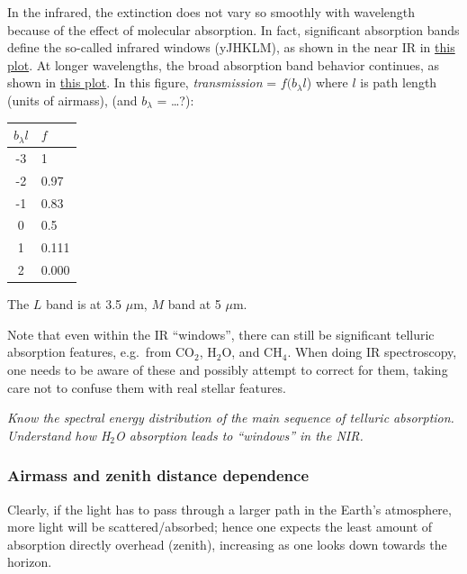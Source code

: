 \documentclass[12pt]{article}
\newcommand{\test}[1]{%
    \begin{center}
        {\parbox{0.9\textwidth}{\textit{\small#1}}}
    \end{center}}
\begin{document}
In the infrared, the extinction does not vary so smoothly with wavelength
because of the effect of molecular absorption. In fact, significant absorption
bands define the so-called infrared windows (yJHKLM), as shown in the near IR in \href{http://astronomy.nmsu.edu/holtz/a535/html/diagrams/a535/mandbell.htm}
{this plot}. At longer wavelengths, the broad absorption band behavior
continues, as shown in \href{http://astronomy.nmsu.edu/holtz/a535/html/diagrams/a535/allen1.htm}
{this plot}. In this figure, \emph{transmission} = $f(b_{\lambda}l$) where $l$
is path length (units of airmass), (and $b_{\lambda}$ = \ldots ?):

\begin{center}
    \begin{tabular}{c l}
        $b_{\lambda}l$ & $f$\\
        \hline\hline
        -3  & 1\\
        -2  & 0.97\\
        -1  & 0.83\\
        0   & 0.5\\
        1   & 0.111\\
        2   & 0.000\\
        \hline
    \end{tabular}
\end{center}

The $L$ band is at 3.5 $\mu$m, $M$ band at 5 $\mu$m.

Note that even within the IR ``windows'', there can still be significant
telluric absorption features, e.g.\ from CO$_{2}$, H$_{2}$O, and CH$_{4}$. When
doing IR spectroscopy, one needs to be aware of these and possibly attempt to
correct for them, taking care not to confuse them with real stellar features.

\test{Know the spectral energy distribution of the main sequence of telluric
absorption. Understand how H$_{2}$O absorption leads to ``windows'' in the
NIR.}

\subsubsection{Airmass and zenith distance dependence}
Clearly, if the light has to pass through a larger path in the Earth's
atmosphere, more light will be scattered/absorbed; hence one expects
the least amount of absorption directly overhead (zenith), increasing
as one looks down towards the horizon.
\end{document}
